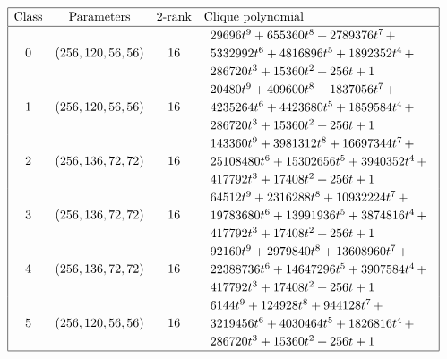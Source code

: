 \begin{table}[!bhpt] %
\small{}
\begin{align*}
\def\arraystretch{1.2}
\begin{array}{|cccl|}
\hline
\text{Class} &
\text{Parameters} &
\text{2-rank} &
\text{Clique polynomial}
\\
\hline
0 &
(256, 120, 56, 56) &
16 &
\begin{array}{l}
29696t^{9} + 655360t^{8} + 2789376t^{7}
\,+
\\
 5332992t^{6} + 4816896t^{5} + 1892352t^{4}
\,+
\\
 286720t^{3} + 15360t^{2} + 256t + 1
\end{array}
\\
1 &
(256, 120, 56, 56) &
16 &
\begin{array}{l}
20480t^{9} + 409600t^{8} + 1837056t^{7}
\,+
\\
 4235264t^{6} + 4423680t^{5} + 1859584t^{4}
\,+
\\
 286720t^{3} + 15360t^{2} + 256t + 1
\end{array}
\\
2 &
(256, 136, 72, 72) &
16 &
\begin{array}{l}
143360t^{9} + 3981312t^{8} + 16697344t^{7}
\,+
\\
 25108480t^{6} + 15302656t^{5} + 3940352t^{4}
\,+
\\
 417792t^{3} + 17408t^{2} + 256t + 1
\end{array}
\\
3 &
(256, 136, 72, 72) &
16 &
\begin{array}{l}
64512t^{9} + 2316288t^{8} + 10932224t^{7}
\,+
\\
 19783680t^{6} + 13991936t^{5} + 3874816t^{4}
\,+
\\
 417792t^{3} + 17408t^{2} + 256t + 1
\end{array}
\\
4 &
(256, 136, 72, 72) &
16 &
\begin{array}{l}
92160t^{9} + 2979840t^{8} + 13608960t^{7}
\,+
\\
 22388736t^{6} + 14647296t^{5} + 3907584t^{4}
\,+
\\
 417792t^{3} + 17408t^{2} + 256t + 1
\end{array}
\\
5 &
(256, 120, 56, 56) &
16 &
\begin{array}{l}
6144t^{9} + 124928t^{8} + 944128t^{7}
\,+
\\
 3219456t^{6} + 4030464t^{5} + 1826816t^{4}
\,+
\\
 286720t^{3} + 15360t^{2} + 256t + 1
\end{array}
\\
\hline
\end{array}
\end{align*}

\caption{$[f_{8,7}]$ extended Cayley classes.}
\label{tab-c8_7_EC_classes}
\end{table}

